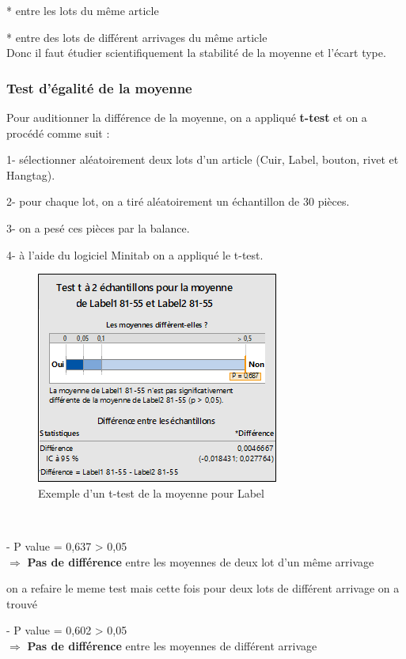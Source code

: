 \documentclass[12pt, a4paper]{thesis}
\begin{document}
* entre les lots du même article

* entre des lots de différent arrivages du même article\\
Donc il faut étudier scientifiquement la stabilité de la moyenne et l'écart type.
\subsubsection{Test d'égalité de la moyenne}

Pour auditionner la différence de la moyenne, on a appliqué \textbf{t-test} et on a procédé comme suit :
\item 1- sélectionner aléatoirement deux lots d'un article (Cuir, Label, bouton, rivet et Hangtag).
\item 2- pour chaque lot, on a tiré aléatoirement un échantillon de 30 pièces.
\item 3- on a pesé ces pièces par la balance.
\item 4- à l'aide du logiciel Minitab on a appliqué le t-test.

\begin{figure}[!h]
\begin{center}
\includegraphics[scale=1.15]{ttest.png}
\caption{Exemple d'un t-test de la moyenne pour Label}
\end{center}
\end{figure}\\

\item - P value = 0,637 > 0,05\\
$\Longrightarrow$ \textbf{Pas de différence} entre les moyennes de deux lot d'un même arrivage

 on a refaire le meme test mais cette fois pour deux lots de différent arrivage on a trouvé 
\item - P value = 0,602 > 0,05\\
$\Longrightarrow$ \textbf{Pas de différence} entre les moyennes de différent arrivage 
\end{document}
